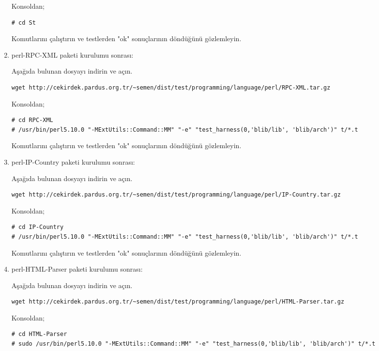 \documentclass[a4paper,10pt]{article}
\begin{document}
\begin{enumerate}
Konsoldan;
\begin{verbatim}
# cd St
\end{verbatim}

Komutlarını çalıştırın ve testlerden "ok" sonuçlarının döndüğünü gözlemleyin.

\item perl-RPC-XML paketi kurulumu sonrası:

Aşağıda bulunan dosyayı indirin ve açın.
\begin{verbatim}
wget http://cekirdek.pardus.org.tr/~semen/dist/test/programming/language/perl/RPC-XML.tar.gz
\end{verbatim}

Konsoldan;
\begin{verbatim}
# cd RPC-XML
# /usr/bin/perl5.10.0 "-MExtUtils::Command::MM" "-e" "test_harness(0,'blib/lib', 'blib/arch')" t/*.t
\end{verbatim}

Komutlarını çalıştırın ve testlerden "ok" sonuçlarının döndüğünü gözlemleyin.

\item perl-IP-Country paketi kurulumu sonrası:

Aşağıda bulunan dosyayı indirin ve açın.
\begin{verbatim}
wget http://cekirdek.pardus.org.tr/~semen/dist/test/programming/language/perl/IP-Country.tar.gz
\end{verbatim}

Konsoldan;
\begin{verbatim}
# cd IP-Country
# /usr/bin/perl5.10.0 "-MExtUtils::Command::MM" "-e" "test_harness(0,'blib/lib', 'blib/arch')" t/*.t
\end{verbatim}

Komutlarını çalıştırın ve testlerden "ok" sonuçlarının döndüğünü gözlemleyin.

\item perl-HTML-Parser paketi kurulumu sonrası:

Aşağıda bulunan dosyayı indirin ve açın.
\begin{verbatim}
wget http://cekirdek.pardus.org.tr/~semen/dist/test/programming/language/perl/HTML-Parser.tar.gz
\end{verbatim}

Konsoldan;
\begin{verbatim}
# cd HTML-Parser
# sudo /usr/bin/perl5.10.0 "-MExtUtils::Command::MM" "-e" "test_harness(0,'blib/lib', 'blib/arch')" t/*.t
\end{verbatim}


\end{enumerate}
\end{document}
